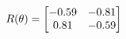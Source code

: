 \documentclass[preview]{standalone}
\begin{document}
\begin{align*}
\special{dvisvgm:raw <g id='unique000'>}R(\theta) = \begin{bmatrix}-0.59 & -0.81\\0.81 & -0.59\end{bmatrix}\special{dvisvgm:raw </g>}
\end{align*}
\end{document}
